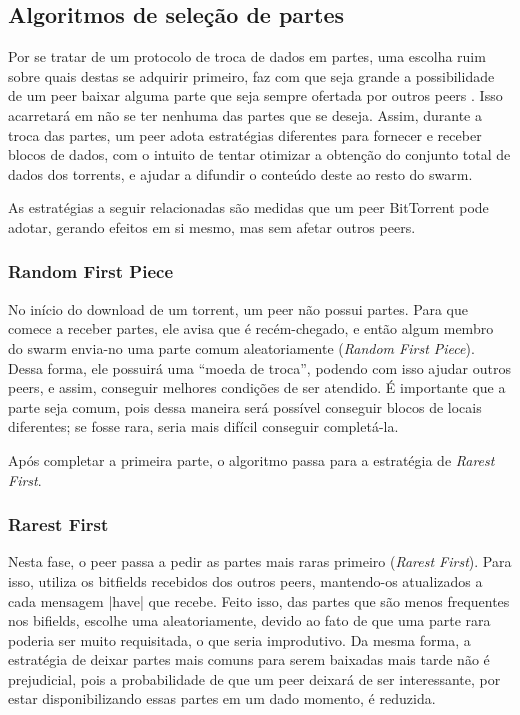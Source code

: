 
\newpage
\subsection*{Algoritmos de seleção de partes}

Por se tratar de um protocolo de troca de dados em partes, uma escolha ruim sobre quais
destas se adquirir primeiro, faz com que seja grande a possibilidade de um \gls*{peer}
baixar alguma parte que seja sempre ofertada por outros \glspl*{peer}
\cite{artigo:bittorrent}. Isso acarretará em não se ter nenhuma das partes que se
deseja. Assim, durante a troca das partes, um \gls*{peer} adota estratégias diferentes
para fornecer e receber blocos de dados, com o intuito de tentar otimizar a obtenção do
conjunto total de dados dos \glspl*{torrent}, e ajudar a difundir o conteúdo deste ao
resto do \gls*{swarm}.

As estratégias a seguir relacionadas são medidas que um \gls*{peer} BitTorrent pode
adotar, gerando efeitos em si mesmo, mas sem afetar outros \glspl*{peer}.

\subsubsection*{Random First Piece}

No início do download de um \gls*{torrent}, um \gls*{peer} não possui partes. Para que
comece a receber partes, ele avisa que é recém-chegado, e então algum membro do
\gls*{swarm} envia-no uma parte comum aleatoriamente (\emph{Random First Piece}). Dessa
forma, ele possuirá uma ``moeda de troca'', podendo com isso ajudar outros \glspl*{peer},
e assim, conseguir melhores condições de ser atendido. É importante que a parte seja
comum, pois dessa maneira será possível conseguir blocos de locais diferentes; se fosse
rara, seria mais difícil conseguir completá-la.

Após completar a primeira parte, o algoritmo passa para a estratégia de \emph{Rarest
First}.

\subsubsection*{Rarest First}
\label{subsubsec:rarest-first}

Nesta fase, o \gls*{peer} passa a pedir as partes mais raras primeiro
(\emph{Rarest First}). Para isso, utiliza os bitfields recebidos dos outros
\glspl*{peer}, mantendo-os atualizados a cada mensagem \bverb|have| que recebe. Feito
isso, das partes que são menos frequentes nos bifields, escolhe uma aleatoriamente,
devido ao fato de que uma parte rara poderia ser muito requisitada, o que seria
improdutivo. Da mesma forma, a estratégia de deixar partes mais comuns para serem
baixadas mais tarde não é prejudicial, pois a probabilidade de que um \gls*{peer}
deixará de ser interessante, por estar disponibilizando essas partes em um dado
momento, é reduzida.

